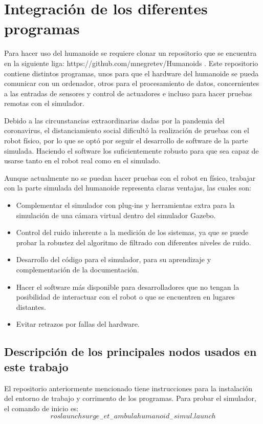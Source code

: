 	\section{Integración de los diferentes programas}
	Para hacer uso del humanoide se requiere clonar un repositorio que se encuentra en la siguiente liga: https://github.com/mnegretev/Humanoids . Este repositorio contiene distintos programas, unos para que el hardware del humanoide se pueda comunicar con un ordenador, otros para el procesamiento de datos, concernientes a las entradas de sensores y control de actuadores e incluso para hacer pruebas remotas con el simulador.
	
	Debido a las circunstancias extraordinarias dadas por la pandemia del coronavirus, el distanciamiento social dificultó la realización de pruebas con el robot físico, por lo que se optó por seguir el desarrollo de software de la parte simulada. Haciendo el software los suficientemente robusto para que sea capaz de usarse tanto en el robot real como en el simulado.
	
	Aunque actualmente no se puedan hacer pruebas con el robot en físico, trabajar con la parte simulada del humanoide representa claras ventajas, las cuales son: 
	 
	\begin{itemize}
	 	\item Complementar el simulador con plug-ins y herramientas extra para la simulación de una cámara virtual dentro del simulador Gazebo.
	 	\item Control del ruido inherente a la medición de los sistemas, ya que se puede probar la robustez del algoritmo de filtrado con diferentes niveles de ruido.
	 	\item Desarrollo del código para el simulador, para su aprendizaje y complementación de la documentación.
	 	\item Hacer el software más disponible para desarrolladores que no tengan la posibilidad de interactuar con el robot o que se encuentren en lugares distantes.
	 	\item Evitar retrazos por fallas del hardware.
	\end{itemize}
	
		\subsection*{Descripción de los principales nodos usados en este trabajo}
		El repositorio anteriormente mencionado tiene instrucciones para la instalación del entorno de trabajo y corrimento de los programas. Para probar el simulador, el comando de inicio es: $$roslaunch surge_-et_-ambula humanoid_-simul.launch$$ 

